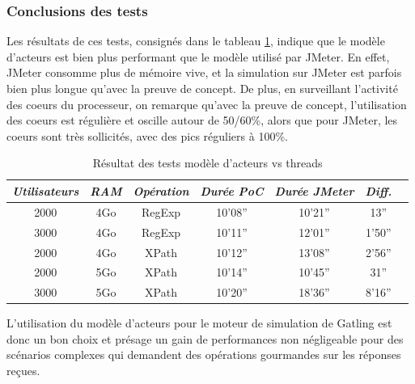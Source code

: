 \subsubsection{Conclusions des tests}
Les résultats de ces tests, consignés dans le tableau \ref{result_tests}, indique que le modèle d'acteurs est bien plus performant que le modèle utilisé par JMeter. En effet, JMeter consomme plus de mémoire vive, et la simulation sur JMeter est parfois bien plus longue qu'avec la preuve de concept. De plus, en surveillant l'activité des coeurs du processeur, on remarque qu'avec la preuve de concept, l'utilisation des coeurs est régulière et oscille autour de 50/60\%, alors que pour JMeter, les coeurs sont très sollicités, avec des pics réguliers à 100\%.
\begin{center}
\begin{table}
\begin{tabular}{c c c c c c l}
\em{Utilisateurs} & \em{RAM} & \em{Opération} & \em{Durée PoC} & \em{Durée JMeter} & \em{Diff.}\\ \hline
2000 & 4Go & RegExp & 10'08'' & 10'21'' & 13''\\
3000 & 4Go & RegExp & 10'11'' & 12'01'' & 1'50''\\
2000 & 4Go & XPath & 10'12'' & 13'08'' & 2'56''\\
2000 & 5Go & XPath & 10'14'' & 10'45'' & 31''\\
3000 & 5Go & XPath & 10'20'' & 18'36'' & 8'16''\\
\end{tabular}
\caption{Résultat des tests modèle d'acteurs vs threads}
\label{result_tests}
\end{table}
\end{center}
L'utilisation du modèle d'acteurs pour le moteur de simulation de Gatling est donc un bon choix et présage un gain de performances non négligeable pour des scénarios complexes qui demandent des opérations gourmandes sur les réponses reçues.

